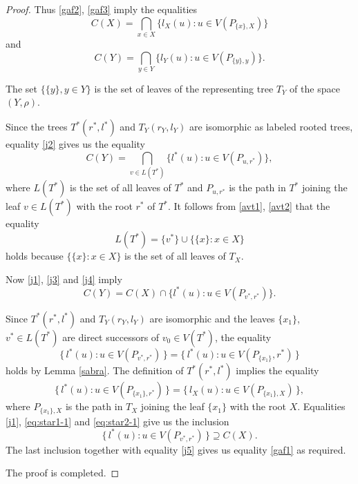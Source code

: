 \documentclass[10pt,a4paper]{amsart}
\begin{document}
\begin{proof}
Thus \eqref{gaf2}, \eqref{gaf3} imply the equalities
\begin{equation}\label{j1}
C(X)=\bigcap_{x\in X}\{l_X(u):u\in V(P_{\{x\},X})\}
\end{equation}
and
\begin{equation}\label{j2}
C(Y)=\bigcap_{y\in Y}\{l_Y(u):u\in V(P_{\{y\},y})\}.
\end{equation}

The set $\{\{y\}, y\in Y\}$ is the set of leaves of the representing tree $T_Y$ of the space $(Y,\rho)$. 


Since the trees $T^*(r^*,l^*)$ and $T_Y(r_Y,l_Y)$ are isomorphic as labeled rooted trees,
equality \eqref{j2} gives us the equality
\begin{equation}\label{j3}
C(Y)=\bigcap_{v\in L(T^*)}\{l^{*}(u):u\in V(P_{u,r^*})\},
\end{equation}
where $L(T^*)$ is the set of all leaves of $T^*$ and
$P_{u,r^*}$ is the path in $T^*$ joining the leaf $v\in L(T^*)$
with the root $r^*$ of $T^*$.
It follows from \eqref{avt1}, \eqref{avt2} that  the equality
\begin{equation}\label{j4}
L(T^*)=\{v^*\}\cup\{\{x\}:x\in X\}
\end{equation}
holds because $\{\{x\}:x\in X\}$ is the set of all leaves of $T_X$.

Now \eqref{j1}, \eqref{j3} and \eqref{j4} imply
\begin{equation}\label{j5}
C(Y)=C(X)\cap\{l^{*}(u):u\in V(P_{v^*,r^*})\}.
\end{equation}










Since $T^*(r^*,l^*)$ and $T_Y(r_Y,l_Y)$ are isomorphic and the leaves $\{x_1\}$, $v^* \in L(T^*)$ are direct successors of $v_0 \in V(T^*)$,
the equality
\begin{equation}
\{\, l^*(u) : u \in V(P_{v^*,r^*}) \,\}
=
\{\, l^*(u) : u \in V(P_{\{x_1\}},r^*) \,\}
\label{eq:star1-1}
\end{equation}
 holds by Lemma \ref{sabra}.
The definition of $T^*(r^*,l^*)$ implies the equality
\begin{equation}
\{\, l^*(u) : u \in V(P_{\{x_1\},r^*}) \,\}
=
\{\, l_X(u) : u \in V(P_{\{x_1\},X}) \,\},
\label{eq:star2-1}
\end{equation}
where $P_{\{x_1\},X}$ is the path in $T_X$ joining the leaf $\{x_1\}$ with the root $X$.
Equalities \eqref{j1}, \eqref{eq:star1-1} and \eqref{eq:star2-1} give us the inclusion
\begin{equation}
\{\, l^*(u) : u \in V(P_{v^*,r^*}) \,\} \supseteq C(X).
\label{eq:inclusion}
\end{equation}
The last inclusion together with equality \eqref{j5} gives us equality \eqref{gaf1} as required.

The proof is completed.
\end{proof}
\end{document}
